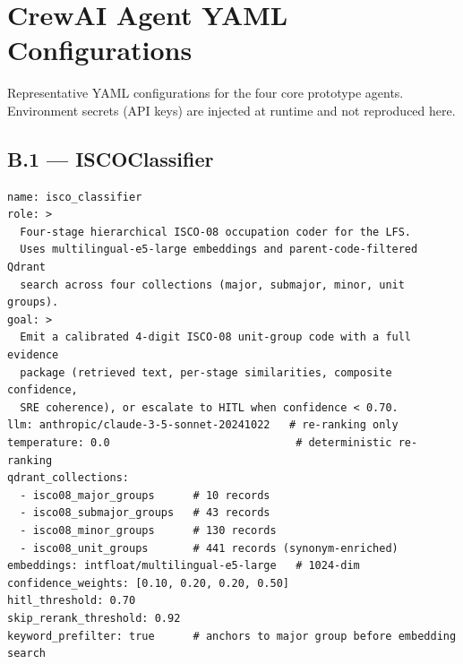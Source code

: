 \chapter{CrewAI Agent YAML Configurations}
\label{app:crewai}

Representative YAML configurations for the four core prototype agents.
Environment secrets (API keys) are injected at runtime and not reproduced here.

\section*{B.1 --- ISCOClassifier}
\begin{lstlisting}[breaklines=true,caption={ISCOClassifier agent configuration.}]
name: isco_classifier
role: >
  Four-stage hierarchical ISCO-08 occupation coder for the LFS.
  Uses multilingual-e5-large embeddings and parent-code-filtered Qdrant
  search across four collections (major, submajor, minor, unit groups).
goal: >
  Emit a calibrated 4-digit ISCO-08 unit-group code with a full evidence
  package (retrieved text, per-stage similarities, composite confidence,
  SRE coherence), or escalate to HITL when confidence < 0.70.
llm: anthropic/claude-3-5-sonnet-20241022   # re-ranking only
temperature: 0.0                             # deterministic re-ranking
qdrant_collections:
  - isco08_major_groups      # 10 records
  - isco08_submajor_groups   # 43 records
  - isco08_minor_groups      # 130 records
  - isco08_unit_groups       # 441 records (synonym-enriched)
embeddings: intfloat/multilingual-e5-large   # 1024-dim
confidence_weights: [0.10, 0.20, 0.20, 0.50]
hitl_threshold: 0.70
skip_rerank_threshold: 0.92
keyword_prefilter: true      # anchors to major group before embedding search
\end{lstlisting}

